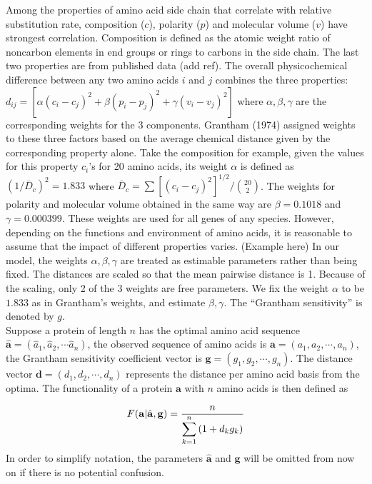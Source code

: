 \documentclass[13pt]{article}
\begin{document}
Among the properties of amino acid side chain that correlate with relative substitution rate, composition ($c$), polarity ($p$) and molecular volume ($v$) have strongest correlation. Composition is defined as the atomic weight ratio of noncarbon elements in end groups or rings to carbons in the side chain. The last two properties are from published data (add ref). The overall physicochemical difference between any two amino acids $i$ and $j$ combines the three properties: $d_{ij} = [\alpha (c_i-c_j)^2 + \beta (p_i - p_j)^2 + \gamma (v_i - v_j)^2]$ where $\alpha, \beta, \gamma$ are the corresponding weights for the 3 components. Grantham (1974) assigned weights to these three factors based on the average chemical distance given by the corresponding property alone. Take the composition for example, given the values for this property $c_i$'s for 20 amino acids, its weight $\alpha$ is defined as $(1/\bar{D}_c)^2 = 1.833$ where $\bar{D}_c = \sum[(c_i - c_j)^2]^{1/2}/\binom{20}{2}$. The weights for polarity and molecular volume obtained in the same way are $\beta = 0.1018$ and $\gamma = 0.000399$. These weights are used for all genes of any species. However, depending on the functions and environment of amino acids, it is reasonable to assume that the impact of different properties varies. (Example here) In our model, the weights $\alpha, \beta, \gamma$ are treated as estimable parameters rather than being fixed. The distances are scaled so that the mean pairwise distance is 1. Because of the scaling, only 2 of the 3 weights are free parameters. We fix the weight $\alpha$ to be $1.833$ as in Grantham's weights, and estimate $\beta, \gamma$. The ``Grantham sensitivity'' is denoted by $g$.\\

Suppose a protein of length $n$ has the optimal amino acid sequence $\hat{\mathbf{a}} = (\hat{a}_1, \hat{a}_2, \cdots \hat{a}_n)$, the observed sequence of amino acids is $\mathbf{a} = (a_1, a_2, \cdots, a_n)$, the Grantham sensitivity coefficient vector is  $\mathbf{g}=(g_1,g_2,\cdots,g_n)$.
The distance vector $\mathbf{d} = (d_1, d_2, \cdots, d_n)$ represents the distance per amino acid basis from the optima. The functionality of a protein $\mathbf{a}$ with $n$ amino acids is then defined as

\begin{equation}
F(\mathbf{a}| \hat{\mathbf{a}},\mathbf{g})  =  \frac{n}{\displaystyle  \sum_{k=1}^n{(1+d_kg_k)}} \label{eq:harmonic}\\
\end{equation}
In order to simplify notation, the parameters $\hat{\mathbf{a}}$ and $\mathbf{g}$ will be omitted from now on if there is no potential confusion.\\
\end{document}
